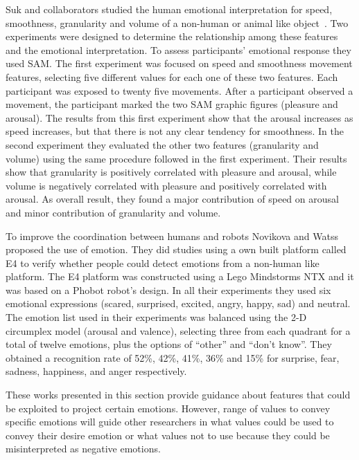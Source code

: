 Suk and collaborators studied the human emotional interpretation for speed, smoothness, granularity and volume of a non-human or animal like object~\cite{NAM2014}. Two experiments were designed to determine the relationship among these features and the emotional interpretation. To assess participants' emotional response they used SAM. The first experiment was focused on speed and smoothness movement features, selecting five different values for each one of these two features. Each participant was exposed to twenty five movements. After a participant observed a movement, the participant marked the two SAM graphic figures (pleasure and arousal).
The results from this first experiment show that the arousal increases as speed increases, but that there is not any clear tendency for smoothness. In the second experiment they evaluated the other two features (granularity and volume) using the same procedure followed in the first experiment. Their results show that granularity is positively correlated with pleasure and arousal, while volume is negatively correlated with pleasure and positively correlated with arousal. As overall result, they found a major contribution of speed on arousal and minor contribution of granularity and volume.

To improve the coordination between humans and robots Novikova and Watss~\cite{Novika2015} proposed the use of emotion. They did studies using a own built platform called E4 to verify whether people could detect emotions from a non-human like platform. The E4 platform was constructed using a Lego Mindstorms NTX and it was based on a Phobot robot's design. In all their experiments they used six emotional expressions (scared, surprised, excited, angry, happy, sad) and neutral. The emotion list used in their experiments was balanced using the 2-D circumplex model (arousal and valence), selecting three from each quadrant for a total of twelve emotions, plus the options of ``other'' and ``don't know''. They obtained a recognition rate of 52\%, 42\%, 41\%, 36\% and 15\% for surprise, fear, sadness, happiness, and anger respectively.

These works presented in this section provide guidance about features that could be exploited to project certain emotions. However, range of values to convey specific emotions will guide other researchers in what values could be used to convey their desire emotion or what values not to use because they could be misinterpreted as negative emotions.  

